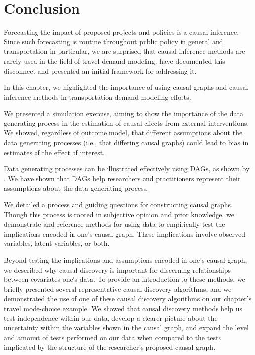 \section{Conclusion}
\label{sec:conclusion}

Forecasting the impact of proposed projects and policies is a causal inference.
Since such forecasting is routine throughout public policy in general and transportation in particular, we are surprised that causal inference methods are rarely used in the field of travel demand modeling.
\citet{brathwaite_2018_causal} have documented this disconnect and presented an initial framework for addressing it.

In this chapter, we highlighted the importance of using causal graphs and 
causal inference methods in transportation demand modeling efforts.

We presented a simulation exercise, aiming to show the importance of the data generating process in the estimation 
of causal effects from external interventions. 
We showed, regardless of outcome model, that different assumptions about the data generating processes (i.e., that differing causal graphs) could 
lead to bias in estimates of the effect of interest.

Data generating processes can be illustrated effectively using DAGs, as shown by \citet{pearl_1995_causal}.
We have shown that DAGs help researchers and practitioners represent their assumptions about the data generating process. 

We detailed a process and guiding questions for constructing causal graphs.
Though this process is rooted in subjective opinion and prior knowledge, we demonstrate and reference methods for using data to empirically test the implications encoded in one's causal graph. 
These implications involve observed variables, latent variables, or both.

Beyond testing the implications and assumptions encoded in one's causal graph, we described why causal discovery is important for discerning relationships between covariates one's data.
To provide an introduction to these methods, we briefly presented several representative causal discovery algorithms, and we demonstrated the use of one of these causal discovery algorithms on our chapter's travel mode-choice example. 
We showed that causal discovery methods help us test independence within our data, 
develop a clearer picture about the uncertainty within the variables shown in the causal graph, 
and expand the level and amount of tests performed on our data when compared to the tests implicated 
by the structure of the researcher's proposed causal graph.

